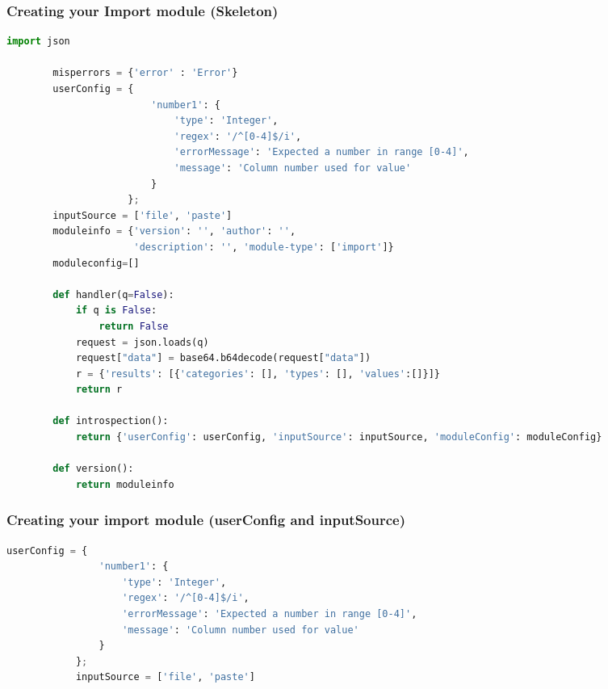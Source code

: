 \begin{frame}[fragile]
      \frametitle{Creating your Import module (Skeleton)}
      \begin{adjustbox}{width=\textwidth,height=5cm,keepaspectratio}
      \begin{lstlisting}[language=python]
        import json

        misperrors = {'error' : 'Error'}
        userConfig = {
                         'number1': {
                             'type': 'Integer',
                             'regex': '/^[0-4]$/i',
                             'errorMessage': 'Expected a number in range [0-4]',
                             'message': 'Column number used for value'
                         }
                     };
        inputSource = ['file', 'paste']
        moduleinfo = {'version': '', 'author': '',
                      'description': '', 'module-type': ['import']}
        moduleconfig=[]

        def handler(q=False):
            if q is False:
                return False
            request = json.loads(q)
            request["data"] = base64.b64decode(request["data"])
            r = {'results': [{'categories': [], 'types': [], 'values':[]}]}
            return r

        def introspection():
            return {'userConfig': userConfig, 'inputSource': inputSource, 'moduleConfig': moduleConfig}

        def version():
            return moduleinfo
              \end{lstlisting}
        \end{adjustbox}
\end{frame}

\begin{frame}[fragile]
    \frametitle{Creating your import module (userConfig and inputSource)}
    \begin{adjustbox}{width=\textwidth,height=5cm,keepaspectratio}
        \begin{lstlisting}[language=python]
            userConfig = {
                'number1': {
                    'type': 'Integer',
                    'regex': '/^[0-4]$/i',
                    'errorMessage': 'Expected a number in range [0-4]',
                    'message': 'Column number used for value'
                }
            };
            inputSource = ['file', 'paste']
        \end{lstlisting}
    \end{adjustbox}
\end{frame}

